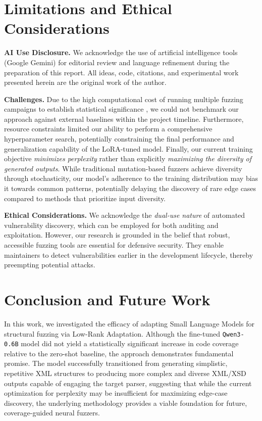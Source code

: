 \documentclass[11pt]{article}
\begin{document}
\section{Limitations and Ethical Considerations}

\textbf{AI Use Disclosure.} We acknowledge the use of artificial intelligence tools (Google Gemini) for editorial review and language refinement during the preparation of this report. All ideas, code, citations, and experimental work presented herein are the original work of the author.

\textbf{Challenges.} Due to the high computational cost of running multiple fuzzing campaigns to establish statistical significance \cite{10.1145/3510003.3510230}, we could not benchmark our approach against external baselines within the project timeline. Furthermore, resource constraints limited our ability to perform a comprehensive hyperparameter search, potentially constraining the final performance and generalization capability of the LoRA-tuned model. Finally, our current training objective \textit{minimizes perplexity} rather than explicitly \textit{maximizing the diversity of generated outputs}. While traditional mutation-based fuzzers achieve diversity through stochasticity, our model's adherence to the training distribution may bias it towards common patterns, potentially delaying the discovery of rare edge cases compared to methods that prioritize input diversity.

\textbf{Ethical Considerations.} We acknowledge the \textit{dual-use nature} of automated vulnerability discovery, which can be employed for both auditing and exploitation. However, our research is grounded in the belief that robust, accessible fuzzing tools are essential for defensive security. They enable maintainers to detect vulnerabilities earlier in the development lifecycle, thereby preempting potential attacks.

\section{Conclusion and Future Work}

In this work, we investigated the efficacy of adapting Small Language Models for structural fuzzing via Low-Rank Adaptation. Although the fine-tuned \texttt{Qwen3-0.6B} model did not yield a statistically significant increase in code coverage relative to the zero-shot baseline, the approach demonstrates fundamental promise. The model successfully transitioned from generating simplistic, repetitive XML structures to producing more complex and diverse XML/XSD outputs capable of engaging the target parser, suggesting that while the current optimization for perplexity may be insufficient for maximizing edge-case discovery, the underlying methodology provides a viable foundation for future, coverage-guided neural fuzzers.
\end{document}
